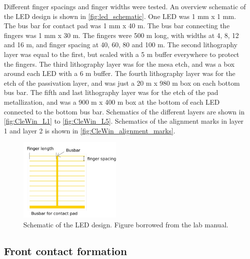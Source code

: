 Different finger spacings and finger widths were tested.
An overview schematic of the LED design is shown in \autoref{fig:led_schematic}.
One LED was 1 mm x 1 mm.
The bus bar for contact pad was 1 mm x 40 \textmu m.
The bus bar connecting the fingers was 1 mm x 30 \textmu m.
The fingers were 500 \textmu m long, with widths at 4, 8, 12 and 16 \textmu m, and finger spacing at 40, 60, 80 and 100 \textmu m.
The second lithography layer was equal to the first, but scaled with a 5 \textmu m buffer everywhere to protect the fingers. 
The third lithography layer was for the mesa etch, and was a box around each LED with a 6 \textmu m buffer. 
The fourth lithography layer was for the etch of the passivation layer, and was just a 20 \textmu m x 980 \textmu m box on each bottom bus bar. 
The fifth and last lithography layer was for the etch of the pad metallization, and was a 900 \textmu m x 400 \textmu m box at the bottom of each LED connected to the bottom bus bar.
Schematics of the different layers are shown in \autoref{fig:CleWin_L1} to \autoref{fig:CleWin_L5}.
Schematics of the alignment marks in layer 1 and layer 2 is shown in \autoref{fig:CleWin_alignment_marks}.




\begin{figure}[ht]
    \centering
    \includegraphics[width=0.45\textwidth]{figures/LED_schematic.jpg}
    \caption{
        Schematic of the LED design.
        Figure borrowed from the lab manual.
    }
    \label{fig:led_schematic}
\end{figure}


\subsection{Front contact formation}
\label{methods:front_contact}

